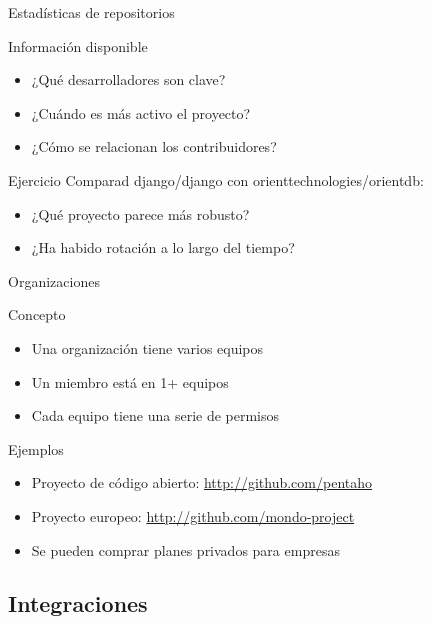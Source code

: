 \documentclass[xcolor=svgnames]{beamer}
\begin{document}
\begin{frame}{Estadísticas de repositorios}
  \begin{block}{Información disponible}
    \begin{itemize}
    \item ¿Qué desarrolladores son clave?
    \item ¿Cuándo es más activo el proyecto?
    \item ¿Cómo se relacionan los contribuidores?
    \end{itemize}
  \end{block}

  \begin{block}{Ejercicio}
    Comparad django/django con orienttechnologies/orientdb:
    \begin{itemize}
    \item ¿Qué proyecto parece más robusto?
    \item ¿Ha habido rotación a lo largo del tiempo?
    \end{itemize}
  \end{block}
\end{frame}

\begin{frame}{Organizaciones}
  \begin{block}{Concepto}
    \begin{itemize}
    \item Una organización tiene varios equipos
    \item Un miembro está en 1+ equipos
    \item Cada equipo tiene una serie de permisos
    \end{itemize}
  \end{block}
  
  \begin{block}{Ejemplos}
    \begin{itemize}
    \item Proyecto de código abierto: \url{http://github.com/pentaho}
    \item Proyecto europeo: \url{http://github.com/mondo-project}
    \item Se pueden comprar planes privados para empresas
    \end{itemize}
  \end{block}
\end{frame}

\subsection{Integraciones}
\end{document}
